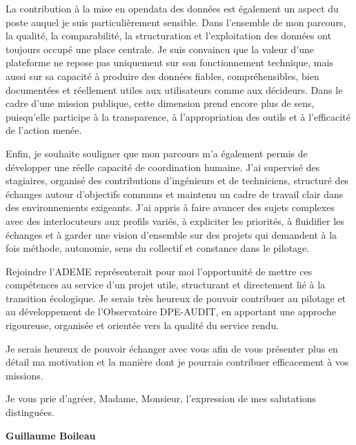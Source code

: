 \documentclass[11pt,a4paper]{altacv}
\begin{document}
{La contribution à la mise en opendata des données est également un aspect du poste auquel je suis particulièrement sensible. Dans l'ensemble de mon parcours, la qualité, la comparabilité, la structuration et l'exploitation des données ont toujours occupé une place centrale. Je suis convaincu que la valeur d'une plateforme ne repose pas uniquement sur son fonctionnement technique, mais aussi sur sa capacité à produire des données fiables, compréhensibles, bien documentées et réellement utiles aux utilisateurs comme aux décideurs. Dans le cadre d'une mission publique, cette dimension prend encore plus de sens, puisqu'elle participe à la transparence, à l'appropriation des outils et à l'efficacité de l'action menée.

Enfin, je souhaite souligner que mon parcours m'a également permis de développer une réelle capacité de coordination humaine. J'ai supervisé des stagiaires, organisé des contributions d'ingénieurs et de techniciens, structuré des échanges autour d'objectifs communs et maintenu un cadre de travail clair dans des environnements exigeants. J'ai appris à faire avancer des sujets complexes avec des interlocuteurs aux profils variés, à expliciter les priorités, à fluidifier les échanges et à garder une vision d'ensemble sur des projets qui demandent à la fois méthode, autonomie, sens du collectif et constance dans le pilotage.

Rejoindre l'ADEME représenterait pour moi l'opportunité de mettre ces compétences au service d'un projet utile, structurant et directement lié à la transition écologique. Je serais très heureux de pouvoir contribuer au pilotage et au développement de l'Observatoire DPE-AUDIT, en apportant une approche rigoureuse, organisée et orientée vers la qualité du service rendu.

Je serais heureux de pouvoir échanger avec vous afin de vous présenter plus en détail ma motivation et la manière dont je pourrais contribuer efficacement à vos missions.

Je vous prie d'agréer, Madame, Monsieur, l'expression de mes salutations distinguées.

\textbf{Guillaume Boileau}

}
\end{document}
